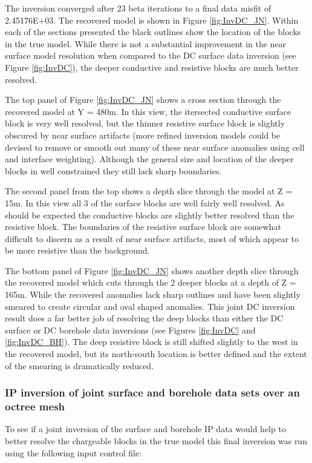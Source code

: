The inversion converged after 23 beta iterations to a final data misfit of 2.45176E+03. The recovered model is shown in Figure \ref{fig:InvDC_JN}. Within each of the sections presented the black outlines show the location of the blocks in the true model. While there is not a substantial improvement in the near surface model resolution when compared to the DC surface data inversion (see Figure \ref{fig:InvDC}), the deeper conductive and resistive blocks are much better resolved. 

The top panel of Figure \ref{fig:InvDC_JN} shows a cross section through the recovered model at Y = 480m. In this view, the itersected conductive surface block is very well resolved, but the thinner resistive surface block is slightly obscured by near surface artifacts (more refined inversion models could be devised to remove or smooth out many of these near surface anomalies using cell and interface weighting). Although the general size and location of the deeper blocks in well constrained they still lack sharp boundaries.

The second panel from the top shows a depth slice through the model at Z = 15m. In this view all 3 of the surface blocks are well fairly well resolved. As should be expected the conductive blocks are slightly better resolved than the resistive block. The boundaries of the resistive surface block are somewhat difficult to discern as a result of near surface artifacts, most of which appear to be more resistive than the background. 

The bottom panel of Figure \ref{fig:InvDC_JN} shows another depth slice through the recovered model which cuts through the 2 deeper blocks at a depth of Z = 165m. While the recovered anomalies lack sharp outlines and have been slightly smeared to create circular and oval shaped anomalies. This joint DC inversion result does a far better job of resolving the deep blocks than either the DC surface or DC borehole data inversions (see Figures \ref{fig:InvDC} and \ref{fig:InvDC_BH}). The deep resistive block is still shifted slightly to the west in the recovered model, but its north-south location is better defined and the extent of the smearing is dramatically reduced.


\subsubsection{IP inversion of joint surface and borehole data sets over an octree mesh} 

To see if a joint inversion of the surface and borehole IP data would help to better resolve the chargeable blocks in the true model this final inversion was run using the following input control file:

